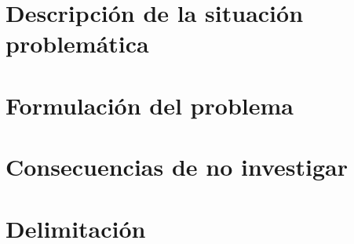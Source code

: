 \section{Descripción de la situación problemática}

\section{Formulación del problema}

\section{Consecuencias de no investigar}

\section{Delimitación}

